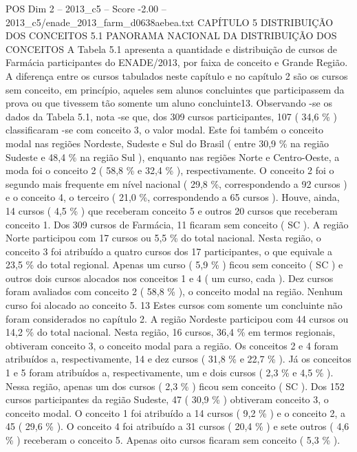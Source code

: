 \begin{textsample}{POS Dim 2 – 2013\_c5 – Score -2.00 – 2013\_c5/enade\_2013\_farm\_d0638aebea.txt}  \label{ex:f2_pos_372}
CAPÍTULO 5 DISTRIBUIÇÃO DOS CONCEITOS 5.1 PANORAMA NACIONAL DA DISTRIBUIÇÃO DOS CONCEITOS A Tabela 5.1 apresenta a quantidade e distribuição de cursos de Farmácia participantes do ENADE/2013, por faixa de conceito e Grande Região.
A diferença entre os cursos tabulados neste capítulo e no capítulo 2 são os cursos sem conceito, em princípio, aqueles sem alunos concluintes que participassem da prova ou que tivessem tão somente um aluno concluinte13.
Observando -se os dados da Tabela 5.1, nota -se que, dos 309 cursos participantes, 107 ( 34,6 \% ) classificaram -se com conceito 3, o valor modal.
Este foi também o conceito modal nas regiões Nordeste, Sudeste e Sul do Brasil ( entre 30,9 \% na região Sudeste e 48,4 \% na região Sul ), enquanto nas regiões Norte e Centro-Oeste, a moda foi o conceito 2 ( 58,8 \% e 32,4 \% ), respectivamente.
O conceito 2 foi o segundo mais frequente em nível nacional ( 29,8 \%, correspondendo a 92 cursos ) e o conceito 4, o terceiro ( 21,0 \%, correspondendo a 65 cursos ).
Houve, ainda, 14 cursos ( 4,5 \% ) que receberam conceito 5 e outros 20 cursos que receberam conceito 1.
Dos 309 cursos de Farmácia, 11 ficaram sem conceito ( SC ).
A região Norte participou com 17 cursos ou 5,5 \% do total nacional.
Nesta região, o conceito 3 foi atribuído a quatro cursos dos 17 participantes, o que equivale a 23,5 \% do total regional.
Apenas um curso ( 5,9 \% ) ficou sem conceito ( SC ) e outros dois cursos alocados nos conceitos 1 e 4 ( um curso, cada ).
Dez cursos foram avaliados com conceito 2 ( 58,8 \% ), o conceito modal na região.
Nenhum curso foi alocado ao conceito 5. 13 Estes cursos com somente um concluinte não foram considerados no capítulo 2.
A região Nordeste participou com 44 cursos ou 14,2 \% do total nacional.
Nesta região, 16 cursos, 36,4 \% em termos regionais, obtiveram conceito 3, o conceito modal para a região.
Os conceitos 2 e 4 foram atribuídos a, respectivamente, 14 e dez cursos ( 31,8 \% e 22,7 \% ).
Já os conceitos 1 e 5 foram atribuídos a, respectivamente, um e dois cursos ( 2,3 \% e 4,5 \% ).
Nessa região, apenas um dos cursos ( 2,3 \% ) ficou sem conceito ( SC ).
Dos 152 cursos participantes da região Sudeste, 47 ( 30,9 \% ) obtiveram conceito 3, o conceito modal.
O conceito 1 foi atribuído a 14 cursos ( 9,2 \% ) e o conceito 2, a 45 ( 29,6 \% ).
O conceito 4 foi atribuído a 31 cursos ( 20,4 \% ) e sete outros ( 4,6 \% ) receberam o conceito 5.
Apenas oito cursos ficaram sem conceito ( 5,3 \% ).

\end{textsample}
